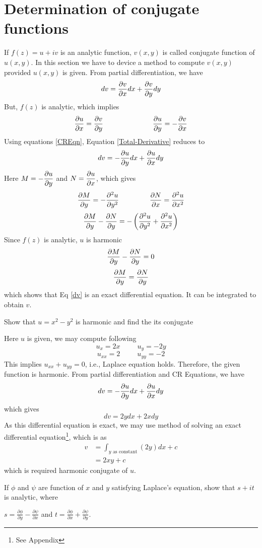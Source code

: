 \section{Determination of conjugate functions}
If $f(z) = u +iv$ is an analytic function, $v(x,y)$ is called conjugate function of $u(x,y)$. In this section we have to device a method to compute $v(x,y)$ provided $u(x,y)$ is given. From partial differentiation, we have 
\begin{equation} \label{Total-Derivative}
dv = \displaystyle \frac{\partial v}{\partial x} dx + \displaystyle \frac{\partial v}{\partial y} dy
\end{equation}
But, $f(z)$ is analytic, which implies 
\begin{equation}\label{CREqn}
\displaystyle \frac{\partial u}{\partial x} = \displaystyle \frac{\partial v}{\partial y} ~~~~~~~~~~~~~~~~~~~~~\displaystyle \frac{\partial u}{\partial y} = - \displaystyle \frac{\partial v}{\partial x}
\end{equation}
Using equations \ref{CREqn}, Equation \ref{Total-Derivative} reduces to
\begin{equation}\label{dv}
dv = - \displaystyle \frac{\partial u}{\partial y} dx + \displaystyle \frac{\partial u}{\partial x} dy
\end{equation}
Here $M= -\displaystyle \frac{\partial u}{\partial y} $ and $N= \displaystyle \frac{\partial u}{\partial x}$, which gives
\[\displaystyle \frac{\partial M}{\partial y} = - \displaystyle \frac{\partial ^{2} u}{\partial y ^{2}} ~~~~~~~~~~~~~\displaystyle \frac{\partial N}{\partial x} = \displaystyle \frac{\partial ^{2} u}{\partial x ^{2}}\]
\[\displaystyle \frac{\partial M}{\partial y}  - \displaystyle \frac{\partial N}{\partial y} = - \left(\displaystyle \frac{\partial ^{2} u}{\partial y ^{2}} + \displaystyle \frac{\partial ^{2} u}{\partial x ^{2}}\right)\]
Since $f(z)$ is analytic, $u$ is harmonic
\[\displaystyle \frac{\partial M}{\partial y}  - \displaystyle \frac{\partial N}{\partial y} = 0\]
\[\displaystyle \frac{\partial M}{\partial y}  = \displaystyle \frac{\partial N}{\partial y} \]
which shows that Eq \ref{dv} is an exact differential equation. It can be integrated to obtain $v$.\\
\begin{example}
Show that $u = x^2 - y^2$ is harmonic and find the its  conjugate
\end{example}
\begin{solution}
Here $u$ is given, we may compute following
\[ u_x = 2x ~~~~~~~~~~~u_y = -2y\]
\[u_{xx} = 2 ~~~~~~~~~~~ u_{yy} = -2\]
This implies $u_{xx}+u_{yy}=0$, i.e., Laplace equation holds. Therefore, the given function is harmonic.
From partial differentiation and CR Equations, we have
\[dv = - \displaystyle \frac{\partial u}{\partial y} dx + \displaystyle \frac{\partial u}{\partial x} dy\]
which gives
\[dv = 2y dx + 2x dy\]
As this differential equation is exact, we may use method of solving an exact differential equation\footnote{See Appendix }, which is as
\begin{align*}
        v &= \int_{y\mbox{ as constant}}(2y) dx + c \\
         &= 2xy +c
\end{align*}
which is required harmonic conjugate of $u$.
\end{solution}
\begin{example}

If $\phi$ and $\psi$ are function of $x$ and $y$ satisfying Laplace's
equation, show that $s+it$ is analytic, where 

$s=\frac{\partial\phi}{\partial y}-\frac{\partial\psi}{\partial x}$
and $t=\frac{\partial\phi}{\partial x}+\frac{\partial\psi}{\partial y}$.

\end{example}

